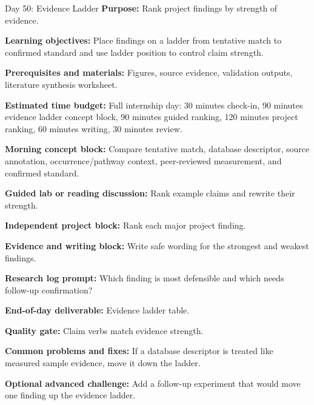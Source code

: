 \begin{dailybox}{Day 50: Evidence Ladder}
\textbf{Purpose:} Rank project findings by strength of evidence.

\textbf{Learning objectives:} Place findings on a ladder from tentative match to confirmed standard and use ladder position to control claim strength.

\textbf{Prerequisites and materials:} Figures, source evidence, validation outputs, literature synthesis worksheet.

\textbf{Estimated time budget:} Full internship day: 30 minutes check-in, 90 minutes evidence ladder concept block, 90 minutes guided ranking, 120 minutes project ranking, 60 minutes writing, 30 minutes review.

\textbf{Morning concept block:} Compare tentative match, database descriptor, source annotation, occurrence/pathway context, peer-reviewed measurement, and confirmed standard.

\textbf{Guided lab or reading discussion:} Rank example claims and rewrite their strength.

\textbf{Independent project block:} Rank each major project finding.

\textbf{Evidence and writing block:} Write safe wording for the strongest and weakest findings.

\textbf{Research log prompt:} Which finding is most defensible and which needs follow-up confirmation?

\textbf{End-of-day deliverable:} Evidence ladder table.

\textbf{Quality gate:} Claim verbs match evidence strength.

\textbf{Common problems and fixes:} If a database descriptor is treated like measured sample evidence, move it down the ladder.

\textbf{Optional advanced challenge:} Add a follow-up experiment that would move one finding up the evidence ladder.
\end{dailybox}

